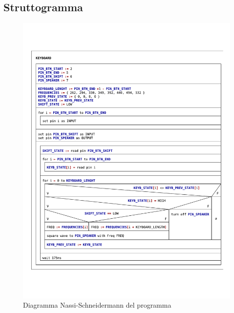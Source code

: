 \documentclass[a4paper]{article}
\begin{document}
		\subsection{Struttogramma}
			\begin{figure}[h!] \centering
				\includegraphics[keepaspectratio=true, width=45em, trim=10em 5em 0 20em]{KEYBOARD.pdf}
				\caption{Diagramma Nassi-Schneidermann del programma}
			\end{figure}
			
\end{document}
